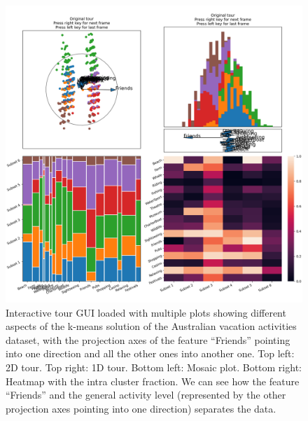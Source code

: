 \documentclass[article]{ajs}
\begin{document}
\begin{figure}[h!]
    \centering
    \includegraphics[width=1\textwidth]{aus_preselection.png}
    \caption{Interactive tour GUI loaded with multiple plots showing different aspects of the k-means solution of the Australian vacation activities dataset, with the projection axes of the feature ``Friends'' pointing into one direction and all the other ones into another one. Top left: 2D tour. Top right: 1D tour. Bottom left: Mosaic plot. Bottom right: Heatmap with the intra cluster fraction. We can see how the feature ``Friends'' and the general activity level (represented by the other projection axes pointing into one direction) separates the data.}
    \label{fig:aus_preselection}
\end{figure}
\end{document}
